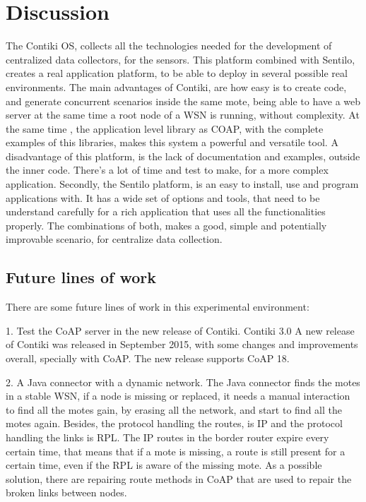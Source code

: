\section{Discussion}

The Contiki OS,
	collects all the technologies needed for the development of centralized data collectors,
	for the sensors.
This platform combined with Sentilo,
	creates a real application platform,
	to be able to deploy in several possible real environments.
The main advantages of Contiki,
	are how easy is to create code,
	and generate concurrent scenarios inside the same mote,
	being able to have a web server at the same time a root node of a WSN is running,
	without complexity.
At the same time ,
	the application level library as COAP,
	with the complete examples of this libraries,
	makes this system a powerful and versatile tool.
A disadvantage of this platform,
	is the lack of documentation and examples,
	outside the inner code.
There's a lot of time and test to make,
	for a more complex application.
Secondly,
	the Sentilo platform,
	is an easy to install,
	use and program applications with.
It has a wide set of options and tools,
	that need to be understand carefully for a rich application that uses all the functionalities properly.
The combinations of both,
	makes a good,
	simple and potentially improvable scenario,
	for centralize data collection.

\subsection{Future lines of work}

There are some future lines of work in this experimental environment: 

1. Test the CoAP server in the new release of Contiki.
Contiki 3.0 A new release of Contiki was released in September 2015,
	with some changes and improvements overall,
	specially with CoAP.
The new release supports CoAP 18.

2. A Java connector with a dynamic network.
The Java connector finds the motes in a stable WSN,
	if a node is missing or replaced,
	it needs a manual interaction to find all the motes gain,
	by erasing all the network,
	and start to find all the motes again.
Besides,
	the protocol handling the routes,
	is IP and the protocol handling the links is RPL.
The IP routes in the border router expire every certain time,
	that means that if a mote is missing,
	a route is still present for a certain time,
	even if the RPL is aware of the missing mote.
As a possible solution,
	there are repairing route methods in CoAP that are used to repair the broken links between nodes.




